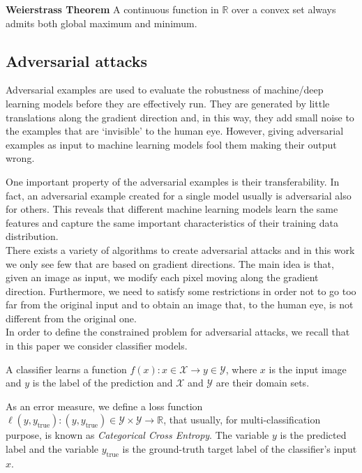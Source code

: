 \documentclass[10pt,twocolumn,letterpaper, english]{article}
\theoremstyle{definition}
\theoremstyle{plain}
\theoremstyle{plain}
\theoremstyle{plain}
\theoremstyle{plain}
\theoremstyle{remark}
\theoremstyle{remark}
\theoremstyle{definition}
\theoremstyle{definition}
\theoremstyle{definition}
\theoremstyle{definition}
\begin{document}
\textbf{Weierstrass Theorem} A continuous function in $\mathbb{R}$ over a convex set always admits both global maximum and minimum.

\subsection{Adversarial attacks}

Adversarial examples are used to evaluate the robustness of machine/deep learning models before they are effectively run. 
They are generated by little translations along the gradient direction and, in this way, they add small noise to the examples that are ‘invisible’ to the human eye. 
However, giving adversarial examples as input to machine learning models fool them making their output wrong.

One important property of the adversarial examples is their transferability. 
In fact, an adversarial example created for a single model usually is adversarial also for others. 
This reveals that different machine learning models learn the same features and capture the same important characteristics of their training data distribution. \\ 

There exists a variety of algorithms to create adversarial attacks and in this work we only see few that are based on gradient directions. 
The main idea is that, given an image as input, we modify each pixel moving along the gradient direction. 
Furthermore, we need to satisfy some restrictions in order not to go too far from the original input and to obtain an image that, to the human eye, is not different from the original one. \\

In order to define the constrained problem for adversarial attacks, we recall that in this paper we consider classifier models. 

A classifier learns a function $f(x): x \in \mathcal{X} \to y \in \mathcal{Y}$, where $x$ is the input image and $y$ is the label of the prediction and $\mathcal{X}$ and $\mathcal{Y}$ are their domain sets. 

As an error measure, we define a loss function $\ell(y, y_{\text{true}}): (y,y_{\text{true}}) \in \mathcal{Y} \times \mathcal{Y} \to \mathbb{R} $, that usually, for multi-classification purpose, is known as \textit{Categorical Cross Entropy}. 
The variable $y$ is the predicted label and the variable $y_{\text{true}}$ is the ground-truth target label of the classifier's input $x$. \\  
\end{document}
